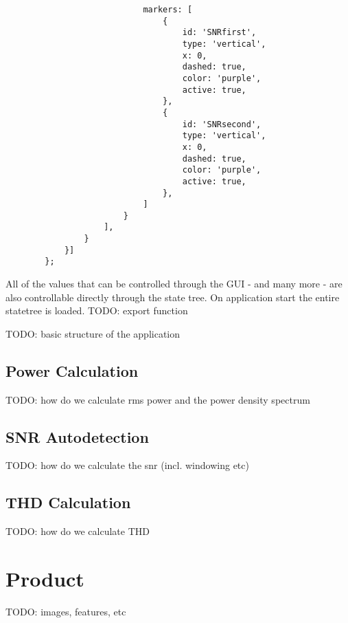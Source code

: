 \begin{tcolorbox}
\begin{verbatim}
                            markers: [
                                {
                                    id: 'SNRfirst',
                                    type: 'vertical',
                                    x: 0,
                                    dashed: true,
                                    color: 'purple',
                                    active: true,
                                },
                                {
                                    id: 'SNRsecond',
                                    type: 'vertical',
                                    x: 0,
                                    dashed: true,
                                    color: 'purple',
                                    active: true,
                                },
                            ]
                        }
                    ],
                }
            }]
        };
    \end{verbatim}
\end{tcolorbox}

All of the values that can be controlled through the GUI - and many more - are also controllable directly through the state tree.
On application start the entire statetree is loaded. TODO: export function


TODO: basic structure of the application

\subsection{Power Calculation}

TODO: how do we calculate rms power and the power density spectrum

\subsection{SNR Autodetection}

TODO: how do we calculate the snr (incl. windowing etc)

\subsection{THD Calculation}

TODO: how do we calculate THD

\section{Product}

TODO: images, features, etc